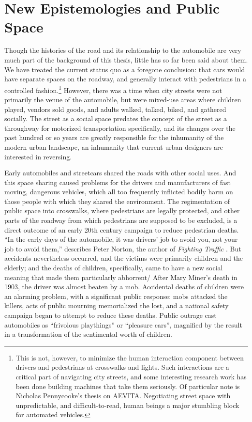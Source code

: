 \chapter{New Epistemologies and Public Space}

Though the histories of the road and its relationship to the
automobile are very much part of the background of this thesis, little
has so far been said about them. We have treated the current status
quo as a foregone conclusion: that cars would have separate spaces on
the roadway, and generally interact with pedestrians in a controlled
fashion.\footnote{This is not, however, to minimize the human
  interaction component between drivers and pedestrians at crosswalks
  and lights. Such interactions are a critical part of navigating city
  streets, and some interesting research work has been done building
  machines that take them seriously. Of particular note is Nicholas
  Pennycooke's thesis on AEVITA\cite{???-aevita}. Negotiating street
  space with unpredictable, and difficult-to-read, human beings a
  major stumbling block for automated vehicles.} However, there was a
time when city streets were not primarily the venue of the automobile,
but were mixed-use areas where children played, vendors sold goods,
and adults walked, talked, biked, and gathered socially. The street as
a social space predates the concept of the street as a throughway for
motorized transportation specifically, and its changes over the past
hundred or so years are greatly responsible for the inhumanity of the
modern urban landscape, an inhumanity that current urban designers are
interested in reversing. 

Early automobiles and streetcars shared the roads with other social
uses. And this space sharing caused problems for the drivers and
manufacturers of fast moving, dangerous vehicles, which all too
frequently inflicted bodily harm on those people with which they
shared the environment. The regimentation of public space into
crosswalks, where pedestrians are legally protected, and other parts
of the roadway from which pedestrians are supposed to be excluded, is
a direct outcome of an early 20th century campaign to reduce
pedestrian deaths. ``In the early days of the automobile, it was
drivers' job to avoid you, not your job to avoid them,'' describes
Peter Norton, the author of \emph{Fighting Traffic}
\cite{???-http://www.vox.com/2015/1/15/7551873/jaywalking-history}.
But accidents nevertheless occurred, and the victims were primarily
children and the elderly\cite{???-vox}; and the deaths of children,
specifically, came to have a new social meaning that made them
particularly abhorrent\cite{???-zelizer}/ 
After Mary Miner's death in 1903, the driver was almost beaten by a
mob\cite[p. 22]{???-zelizer}. Accidental deaths of children were an
alarming problem, with a significant public response:  mobs attacked
the killers, acts of public mourning memorialized the lost, and a
national safety campaign began to attempt to reduce these
deaths\cite[p. 23]{???-zelizer}. Public outrage cast automobiles as
``frivolous playthings'' or ``pleasure cars''\cite{???-vox}, magnified
by the result in a transformation of the sentimental worth of
children\cite[p. 23]{???-zelizer}. 

